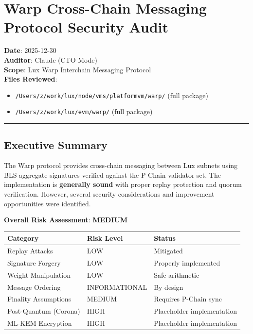 \documentclass[
]{article}
\author{}
\date{}
\newcounter{none} %
\providecommand{\tightlist}{%
  \setlength{\itemsep}{0pt}\setlength{\parskip}{0pt}}
\begin{document}
\section{Warp Cross-Chain Messaging Protocol Security
Audit}\label{warp-cross-chain-messaging-protocol-security-audit}

\textbf{Date}: 2025-12-30\\
\textbf{Auditor}: Claude (CTO Mode)\\
\textbf{Scope}: Lux Warp Interchain Messaging Protocol\\
\textbf{Files Reviewed}:

\begin{itemize}
\tightlist
\item
  \texttt{/Users/z/work/lux/node/vms/platformvm/warp/} (full package)
\item
  \texttt{/Users/z/work/lux/evm/warp/} (full package)
\end{itemize}

\begin{center}\rule{0.5\linewidth}{0.5pt}\end{center}

\subsection{Executive Summary}\label{executive-summary}

The Warp protocol provides cross-chain messaging between Lux subnets
using BLS aggregate signatures verified against the P-Chain validator
set. The implementation is \textbf{generally sound} with proper replay
protection and quorum verification. However, several security
considerations and improvement opportunities were identified.

\textbf{Overall Risk Assessment}: \textbf{MEDIUM}

{\def\LTcaptype{none} %
\begin{longtable}[]{@{}lll@{}}
\toprule\noalign{}
Category & Risk Level & Status \\
\midrule\noalign{}
\endhead
\bottomrule\noalign{}
\endlastfoot
Replay Attacks & LOW & Mitigated \\
Signature Forgery & LOW & Properly implemented \\
Weight Manipulation & LOW & Safe arithmetic \\
Message Ordering & INFORMATIONAL & By design \\
Finality Assumptions & MEDIUM & Requires P-Chain sync \\
Post-Quantum (Corona) & HIGH & Placeholder implementation \\
ML-KEM Encryption & HIGH & Placeholder implementation \\
\end{longtable}
}
\end{document}
